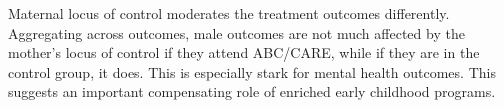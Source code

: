 Maternal locus of control moderates the treatment outcomes differently. Aggregating across outcomes, male outcomes are not much affected by the mother's locus of control if they attend ABC/CARE, while if they are in the control group, it does. This is especially stark for mental health outcomes. This suggests an important compensating role of enriched early childhood programs.



